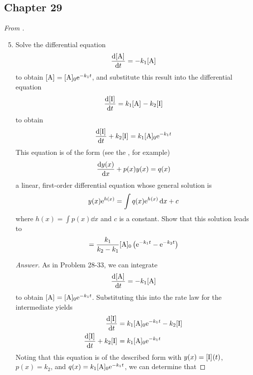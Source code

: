 \documentclass[../psets.tex]{subfiles}
\begin{document}
\subsection*{Chapter 29}
\emph{From \textcite{bib:McQuarrieSimon}.}
\begin{enumerate}[label={\textbf{29-\arabic*.}},leftmargin=3.5em]
    \setcounter{enumi}{4}
    \item Solve the differential equation
    \begin{equation*}
        \dv{\cnc{A}}{t} = -k_1\cnc{A}
    \end{equation*}
    to obtain $\cnc{A}=\cnc[0]{A}\e[-k_1t]$, and substitute this result into the differential equation
    \begin{equation*}
        \dv{\cnc{I}}{t} = k_1\cnc{A}-k_2\cnc{I}
    \end{equation*}
    to obtain
    \begin{equation*}
        \dv{\cnc{I}}{t}+k_2\cnc{I} = k_1\cnc[0]{A}\e[-k_1t]
    \end{equation*}
    This equation is of the form (see the \textcite{bib:CRCTables}, for example)
    \begin{equation*}
        \dv{y(x)}{x}+p(x)y(x) = q(x)
    \end{equation*}
    a linear, first-order differential equation whose general solution is
    \begin{equation*}
        y(x)\e[h(x)] = \int q(x)\e[h(x)]\dd{x}+c
    \end{equation*}
    where $h(x)=\int p(x)\dd{x}$ and $c$ is a constant. Show that this solution leads to
    \begin{equation*}
        [\ce{I}] = \frac{k_1}{k_2-k_1}\cnc[0]{A}\left( \e[-k_1t]-\e[-k_2t] \right)
    \end{equation*}
    \begin{proof}[Answer]
        As in Problem 28-33, we can integrate
        \begin{equation*}
            \dv{\cnc{A}}{t} = -k_1\cnc{A}
        \end{equation*}
        to obtain $\cnc{A}=\cnc[0]{A}\e[-k_1t]$. Substituting this into the rate law for the intermediate  yields
        \begin{align*}
            \dv{\cnc{I}}{t} &= k_1\cnc[0]{A}\e[-k_1t]-k_2\cnc{I}\\
            \dv{\cnc{I}}{t}+k_2\cnc{I} &= k_1\cnc[0]{A}\e[-k_1t]
        \end{align*}
        Noting that this equation is of the described form with $y(x)=\cnc{I}(t)$, $p(x)=k_2$, and $q(x)=k_1\cnc[0]{A}\e[-k_1t]$, we can determine that

\end{proof}
\end{enumerate}
\end{document}
